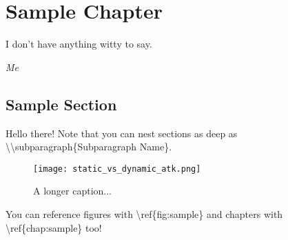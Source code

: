 \chapter{Sample Chapter} \label{chap:sample}
    \epigraph{I don't have anything witty to say.}{\textit{Me}}

    \section{Sample Section}
        Hello there! Note that you can nest sections as deep as \textbackslash \textbackslash subparagraph\{Subparagraph Name\}.\\

        \begin{figure}
            \centering
            \texttt{[image: static\_vs\_dynamic\_atk.png]}
            \caption[Sample Figure]{A longer caption...}
            \label{fig:sample}
        \end{figure}

        You can reference figures with \textbackslash ref\{fig:sample\} and chapters with \textbackslash ref\{chap:sample\} too!
